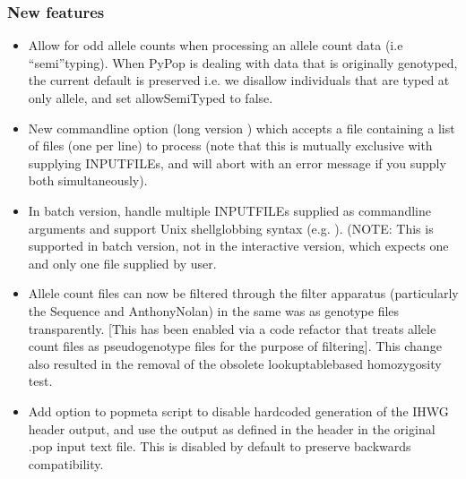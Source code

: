 \documentclass[letterpaper,10pt,english,openany,oneside]{sphinxmanual}
\begin{document}
\subsubsection{New features}
\label{\detokenize{docs/guide-chapter-changes:id2}}\begin{itemize}
\item {} 
\sphinxAtStartPar
Allow for odd allele counts when processing an allele count data
(i.e “semi”\sphinxhyphen{}typing).  When PyPop is dealing with data that is
originally genotyped, the current default is preserved i.e.  we
dis\sphinxhyphen{}allow individuals that are typed at only allele, and set
allowSemiTyped to false.

\item {} 
\sphinxAtStartPar
New command\sphinxhyphen{}line option  (long version ) which
accepts a file containing a list of files (one per line) to
process (note that this is mutually exclusive with supplying
INPUTFILEs, and will abort with an error message if you supply
both simultaneously).

\item {} 
\sphinxAtStartPar
In batch version, handle multiple INPUTFILEs supplied as command\sphinxhyphen{}line
arguments and support Unix shell\sphinxhyphen{}globbing syntax (e.g. ). (NOTE: This is supported  in
batch version, not in the interactive version, which expects one
and only one file supplied by user.

\item {} 
\sphinxAtStartPar
Allele count files can now be filtered through the filter apparatus
(particularly the Sequence and AnthonyNolan) in the same was as
genotype files transparently.  {[}This has been enabled via a code
refactor that treats allele count files as pseudo\sphinxhyphen{}genotype files
for the purpose of filtering{]}.  This change also resulted in the
removal of the obsolete lookup\sphinxhyphen{}table\sphinxhyphen{}based homozygosity test.

\item {} 
\sphinxAtStartPar
Add  option to popmeta script to disable hardcoded
generation of the IHWG header output, and use the output as
defined in the header in the original .pop input text file.  This
is disabled by default to preserve backwards compatibility.


\end{itemize}
\end{document}
